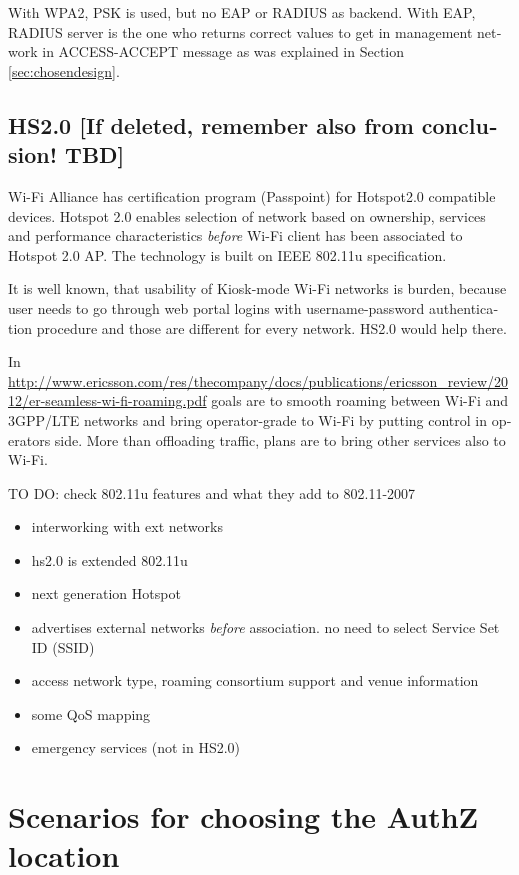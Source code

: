 \documentclass[12pt,a4paper,english]{tutthesis}
\begin{document}
\begin{otherlanguage}{english}
With WPA2, PSK is used, but no EAP or RADIUS as backend.  With EAP,
RADIUS server is the one who returns correct values to get in
management network in ACCESS-ACCEPT message as was
explained in Section \ref{sec:chosendesign}.


\subsection{HS2.0 [If deleted, remember also from conclusion! TBD]}
\label{sec-4-5-1}

Wi-Fi Alliance has certification program (Passpoint) for Hotspot2.0 compatible
devices.  Hotspot 2.0 enables selection of network based on ownership,
services and performance characteristics \emph{before} Wi-Fi client has
been associated to Hotspot 2.0 AP. The technology is built on
IEEE 802.11u specification.




It is well known, that usability of Kiosk-mode Wi-Fi
 networks is burden, because user needs to go through 
web portal logins with username-password authentication 
procedure and those are different for every network.
HS2.0 would help there.

In 
\url{http://www.ericsson.com/res/thecompany/docs/publications/ericsson_review/2012/er-seamless-wi-fi-roaming.pdf}
goals are to smooth roaming between Wi-Fi and 3GPP/LTE networks
and bring operator-grade to Wi-Fi by putting control in operators side. More
than offloading traffic, plans are to bring other services also to Wi-Fi.

TO DO: check 802.11u features and what they add to 802.11-2007
\begin{itemize}
\item interworking with ext networks
\item hs2.0 is extended 802.11u
\item next generation Hotspot
\item advertises external networks \emph{before} association. no need to
select Service Set ID (SSID)
\item access network type, roaming consortium support and venue information
\item some QoS mapping
\item emergency services (not in HS2.0)
\end{itemize}


\section{Scenarios for choosing the AuthZ location}
\label{sec-4-6}



\end{otherlanguage}
\end{document}
